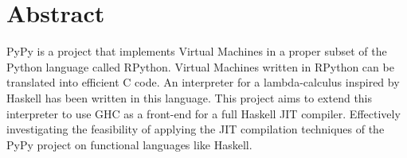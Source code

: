 
\chapter*{Abstract}

PyPy is a project that implements Virtual Machines in a proper subset of
the Python language called RPython. Virtual Machines written in RPython
can be translated into efficient C code. An interpreter for a lambda-calculus inspired by
Haskell has been written in this language.
This project aims to extend this interpreter to use GHC as a front-end for
a full Haskell JIT compiler. Effectively investigating the feasibility
of applying the JIT compilation techniques of the PyPy project on functional
languages like Haskell.

